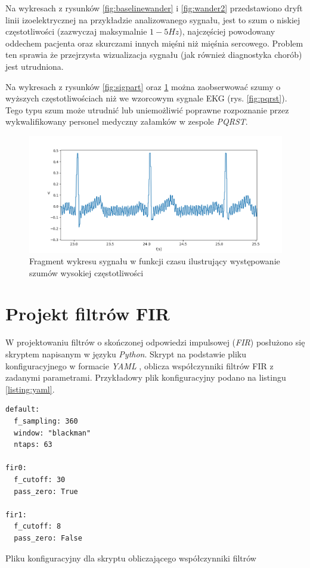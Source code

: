 Na wykresach z rysunków \ref{fig:baselinewander} i \ref{fig:wander2} przedstawiono dryft linii izoelektrycznej 
na przykładzie analizowanego sygnału, jest to szum o niskiej częstotliwości (zazwyczaj maksymalnie $1-5 Hz$), 
najczęściej powodowany oddechem pacjenta oraz skurczami innych mięśni niż mięśnia sercowego. 
Problem ten sprawia że przejrzysta wizualizacja sygnału (jak również diagnostyka chorób) 
jest utrudniona. 

Na wykresach z rysunków \ref{fig:sigpart} oraz \ref{fig:hfnoise} można zaobserwować szumy o wyższych 
częstotliwościach niż we wzorcowym sygnale EKG (rys. \ref{fig:pqrst}). 
Tego typu szum może utrudnić lub uniemożliwić poprawne rozpoznanie przez wykwalifikowany personel medyczny 
załamków w zespole \textit{PQRST}.

\begin{figure}[h!]
    \centering 
    \includegraphics[scale=0.6]{pl/media/high_frequency_noise.png}
    \caption{Fragment wykresu sygnału w funkcji czasu ilustrujący występowanie szumów wysokiej częstotliwości}
    \label{fig:hfnoise}
\end{figure}

\newpage 

\section{Projekt filtrów FIR}

W projektowaniu filtrów o skończonej odpowiedzi impulsowej (\textit{FIR}) posłużono się skryptem napisanym w języku \textit{Python}.
Skrypt na podstawie pliku konfiguracyjnego w formacie \textit{YAML} \cite{yaml}, oblicza współczynniki filtrów FIR z zadanymi parametrami. 
Przykładowy plik konfiguracyjny podano na listingu \ref{listing:yaml}.

\begin{listing}
\begin{verbatim}
default:
  f_sampling: 360
  window: "blackman"
  ntaps: 63 

fir0:
  f_cutoff: 30 
  pass_zero: True 

fir1:
  f_cutoff: 8 
  pass_zero: False 
\end{verbatim}
    \caption{Pliku konfiguracyjny dla skryptu obliczającego współczynniki filtrów}
\label{listing:yaml}
\end{listing}
 
